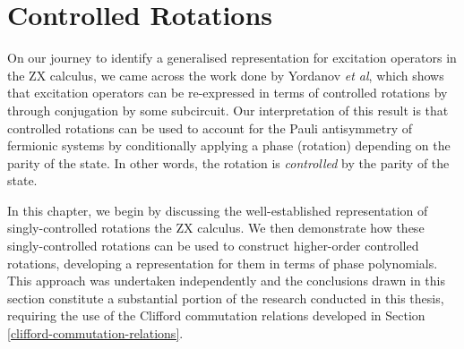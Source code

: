 \chapter{Controlled Rotations}%
\label{controlled-rotations}

On our journey to identify a generalised representation for excitation operators in the ZX calculus, we came across the work done by Yordanov \textit{et al}, which shows that excitation operators can be re-expressed in terms of controlled rotations by through conjugation by some subcircuit. Our interpretation of this result is that controlled rotations can be used to account for the Pauli antisymmetry of fermionic systems by conditionally applying a phase (rotation) depending on the parity of the state. In other words, the rotation is \textit{controlled} by the parity of the state.

In this chapter, we begin by discussing the well-established representation of singly-controlled rotations the ZX calculus. We then demonstrate how these singly-controlled rotations can be used to construct higher-order controlled rotations, developing a representation for them in terms of phase polynomials. This approach was undertaken independently and the conclusions drawn in this section constitute a substantial portion of the research conducted in this thesis, requiring the use of the Clifford commutation relations developed in Section \ref{clifford-commutation-relations}.
